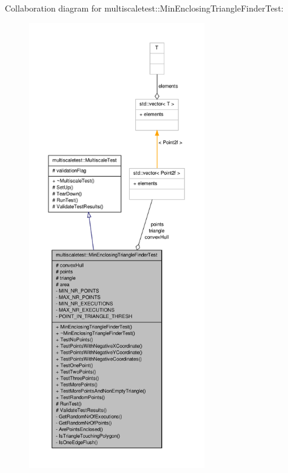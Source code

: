 \-Collaboration diagram for multiscaletest\-:\-:\-Min\-Enclosing\-Triangle\-Finder\-Test\-:
\nopagebreak
\begin{figure}[H]
\begin{center}
\leavevmode
\includegraphics[height=550pt]{classmultiscaletest_1_1MinEnclosingTriangleFinderTest__coll__graph}
\end{center}
\end{figure}

